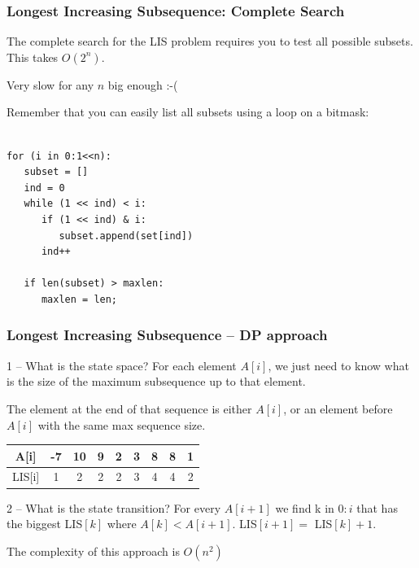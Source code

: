 \documentclass{beamer}
\begin{document}
\begin{frame}[fragile]
  \frametitle{Longest Increasing Subsequence: Complete Search}

  The complete search for the LIS problem requires you to test 
  all possible subsets. This takes $O(2^n)$. 

  \bigskip

  Very slow for any $n$ big enough :-(

  {\small
  \begin{block}{}
    Remember that you can easily list all subsets using a loop on a bitmask:
    {\smaller
\begin{verbatim}

for (i in 0:1<<n):
   subset = []
   ind = 0
   while (1 << ind) < i:
      if (1 << ind) & i:
         subset.append(set[ind])
      ind++

   if len(subset) > maxlen:
      maxlen = len;
\end{verbatim}
    }
  \end{block}}
\end{frame}

\begin{frame}
  \frametitle{Longest Increasing Subsequence -- DP approach}
  {\smaller
  \begin{block}{1 -- What is the state space?}
    For each element $A[i]$, we just need to know what is the size of
    the maximum subsequence up to that element.

    \medskip

    The element at the end of that sequence is either $A[i]$, or an element 
    before $A[i]$ with the same max sequence size.
  \end{block}

  \bigskip

  \begin{tabular}{|c|c|c|c|c|c|c|c|c|}
    \hline
    A[i] & -7 & 10 & 9 & 2 & 3 & 8 & 8 & 1\\
    \hline
    LIS[i] & 1 & 2 & 2 & 2 & 3 & 4 & 4 & 2\\
    \hline
  \end{tabular}

  \begin{block}{2 -- What is the state transition?}
    For every $A[i+1]$ we find k in $0:i$ that has the biggest
    LIS$[k]$ where $A[k] < A[i+1]$. LIS$[i+1] =$ LIS$[k] + 1$.
  \end{block}

  The complexity of this approach is $O(n^2)$
  }
\end{frame}
\end{document}
